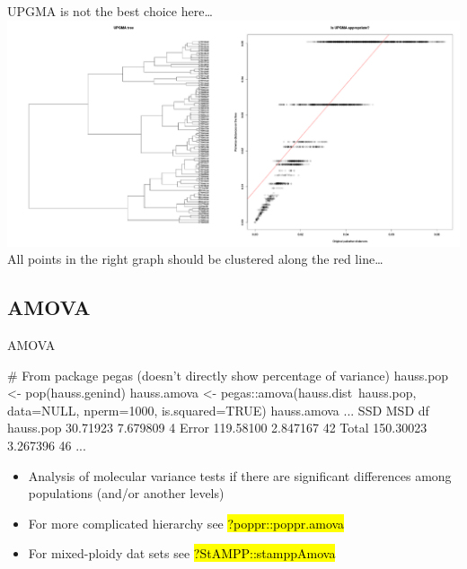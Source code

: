 \documentclass[compress, ucs, xelatex, 11pt, xcolor=svgnames,
  hyperref={
    bookmarks=true,
    unicode=true,
    colorlinks=true,
    pdftitle={Molecular data in R},
    plainpages=false,
    pdfauthor={Vojtech Zeisek},
    pdfsubject={Course about phylogeny and evolution in R},
    pdfcreator={XeLaTeX},
    pdfkeywords={R, evolution, phylogeny, molecular data},
    linkcolor=Tomato,
    anchorcolor=SaddleBrown,
    citecolor=Goldenrod,
    filecolor=DarkMagenta,
    menucolor=Sienna,
    urlcolor=DarkTurquoise,
    pdftex},
  url={hyphens, lowtilde} %
  ]{beamer}
\renewcommand{\texttt}[1]{\hl{\ttfamily #1}}
\begin{document}
\begin{frame}{UPGMA is not the best choice here\ldots}
  \includegraphics[width=\textwidth]{upgma.png}
  \vfil
  All points in the right graph should be clustered along the red line\ldots
  \vfill
\end{frame}

\subsection{AMOVA} %

\begin{frame}[fragile]{AMOVA}
  \begin{spluscode}
    # From package pegas (doesn't directly show percentage of variance)
    hauss.pop <- pop(hauss.genind)
    hauss.amova <- pegas::amova(hauss.dist~hauss.pop, data=NULL,
      nperm=1000, is.squared=TRUE)
    hauss.amova
    ...
                    SSD      MSD df
    hauss.pop  30.71923 7.679809  4
    Error     119.58100 2.847167 42
    Total     150.30023 3.267396 46
    ...
  \end{spluscode}
  \begin{itemize}
    \item Analysis of molecular variance tests if there are significant differences among populations (and/or another levels)
    \item For more complicated hierarchy see \texttt{?poppr::poppr.amova}
    \item For mixed-ploidy dat sets see \texttt{?StAMPP::stamppAmova}
  \end{itemize}
\end{frame}
\end{document}
